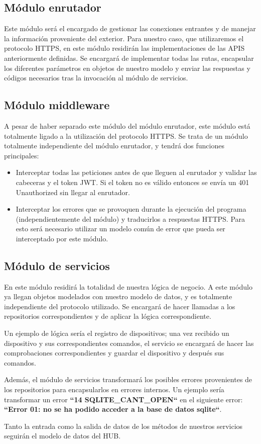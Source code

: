 \subsection{Módulo enrutador}
Este módulo será el encargado de gestionar las conexiones entrantes y de manejar la información proveniente del exterior. Para nuestro caso, que utilizaremos
el protocolo HTTPS, en este módulo residirán las implementaciones de las APIS anteriormente definidas. Se encargará de implementar todas las rutas, encapsular
los diferentes parámetros en objetos de nuestro modelo y enviar las respuestas y códigos necesarios tras la invocación al módulo de servicios.
\subsection{Módulo middleware}
A pesar de haber separado este módulo del módulo enrutador, este módulo está totalmente ligado a la utilización del protocolo HTTPS. 
Se trata de un módulo totalmente independiente del módulo enrutador, y tendrá dos funciones principales:
\begin{itemize}
\setlength\itemsep{6pt plus 1pt minus 1pt}
\item Interceptar todas las peticiones antes de que lleguen al enrutador y validar las cabeceras y el token JWT. Si el token no es válido entonces
se envía un 401 Unauthorized sin llegar al enrutador.
\item Interceptar los errores que se provoquen durante la ejecución del programa (independientemente del módulo) y traducirlos a respuestas HTTPS. Para esto 
será necesario utilizar un modelo común de error que pueda ser interceptado por este módulo.
\end{itemize}
\subsection{Módulo de servicios}
En este módulo residirá la totalidad de nuestra lógica de negocio. A este módulo ya llegan objetos modelados con nuestro modelo de datos, y es totalmente
independiente del protocolo utilizado. Se encargará de hacer llamadas a los repositorios correspondientes y de aplicar la lógica correspondiente.
\par
Un ejemplo de lógica sería el registro de dispositivos; una vez recibido un dispositivo y sus correspondientes comandos, el servicio se encargará de hacer
las comprobaciones correspondientes y guardar el dispositivo y después sus comandos.
\par
Además, el módulo de servicios transformará los posibles errores provenientes de los repositorios para encapsularlos en errores internos. Un ejemplo sería
transformar un error \textbf{``14 SQLITE\_CANT\_OPEN``} en el siguiente error: \textbf{``Error 01: no se ha podido acceder a la base de datos sqlite``}.
\par
Tanto la entrada como la salida de datos de los métodos de nuestros servicios seguirán el modelo de datos del HUB.

